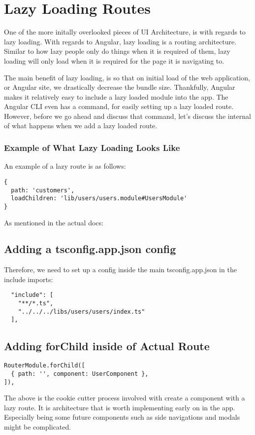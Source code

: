 
\chapter{ Lazy Loading Routes }
One of the more initally overlooked pieces of UI Architecture, is with regards to 
lazy loading. With regards to Angular, lazy loading is a routing architecture.
Similar to how lazy people only do things when it is required of them, lazy loading 
will only load when it is required for the page it is navigating to. 

The main benefit of lazy loading, is so that on initial load of the web application, 
or Angular site, we drastically decrease the bundle size. Thankfully, Angular 
makes it relatively easy to include a lazy loaded module into the app. The Angular CLI 
even has a command, for easily setting up a lazy loaded route. However, before we go 
ahead and discuss that command, let's discuss the internal of what happens when we
add a lazy loaded route. 

\subsection{Example of What Lazy Loading Looks Like}
An example of a lazy route is as follows:
\begin{lstlisting}
{
  path: 'customers',
  loadChildren: 'lib/users/users.module#UsersModule'
}
\end{lstlisting}

As mentioned in the actual docs:

\section{Adding a tsconfig.app.json config}
Therefore, we need to set up a config inside the main tsconfig.app.json in the
include imports:
\begin{verbatim}
  "include": [
    "**/*.ts",
    "../../../libs/users/users/index.ts"
  ],
\end{verbatim}

\section{Adding forChild inside of Actual Route}
\begin{lstlisting}
RouterModule.forChild([
  { path: '', component: UserComponent },
]),
\end{lstlisting}

The above is the cookie cutter process involved with create a component with a
lazy route. It is architecture that is worth implementing early on in the app.
Especially being some future components such as side navigations and modals
might be complicated.
